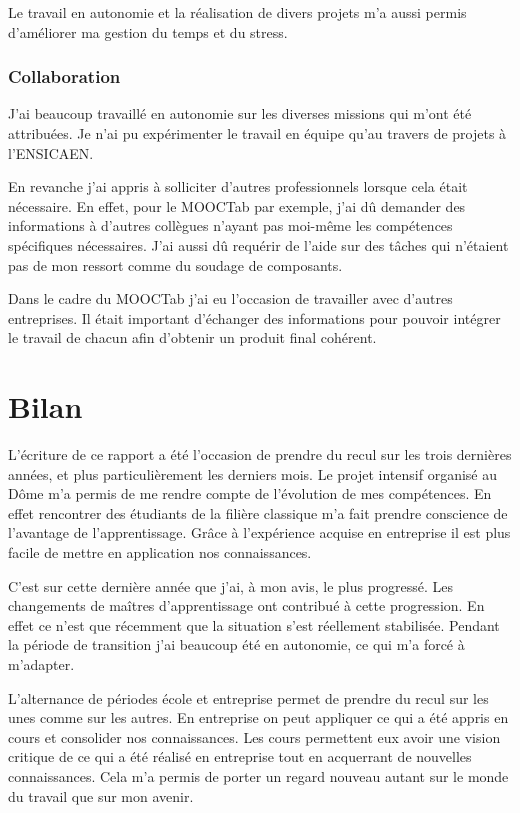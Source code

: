 \documentclass[french,12pt,a4paper,titlepage,openright,openbib]{report}
\begin{document}
Le travail en autonomie et la réalisation de divers projets m'a aussi permis d'améliorer ma gestion du temps et du stress.

\subsection{Collaboration}
J'ai beaucoup travaillé en autonomie sur les diverses missions qui m'ont été attribuées. Je n'ai pu expérimenter le travail en équipe qu'au travers de projets à l'ENSICAEN.

En revanche j'ai appris à solliciter d'autres professionnels lorsque cela était nécessaire.
En effet, pour le MOOCTab par exemple, j'ai dû demander des informations à d'autres collègues n'ayant pas moi-même les compétences spécifiques nécessaires.
J'ai aussi dû requérir de l'aide sur des tâches qui n'étaient pas de mon ressort comme du soudage de composants.

Dans le cadre du MOOCTab j'ai eu l'occasion de travailler avec d'autres entreprises. Il était important d'échanger des informations pour pouvoir intégrer le travail de chacun afin d'obtenir un produit final cohérent.

\chapter{Bilan}
L'écriture de ce rapport a été l'occasion de prendre du recul sur les trois dernières années, et plus particulièrement les derniers mois.
Le projet intensif organisé au Dôme m'a permis de me rendre compte de l'évolution de mes compétences.
En effet rencontrer des étudiants de la filière classique m'a fait prendre conscience de l'avantage de l'apprentissage. Grâce à l'expérience acquise en entreprise il est plus facile de mettre en application nos connaissances.

C'est sur cette dernière année que j'ai, à mon avis, le plus progressé.
Les changements de maîtres d'apprentissage ont contribué à cette progression. En effet ce n'est que récemment que la situation s'est réellement stabilisée. Pendant la période de transition j'ai beaucoup été en autonomie, ce qui m'a forcé à m'adapter.

L'alternance de périodes école et entreprise permet de prendre du recul sur les unes comme sur les autres. En entreprise on peut appliquer ce qui a été appris en cours et consolider nos connaissances. Les cours permettent eux avoir une vision critique de ce qui a été réalisé en entreprise tout en acquerrant de nouvelles connaissances. Cela m'a permis de porter un regard nouveau autant sur le monde du travail que sur mon avenir.
\end{document}
